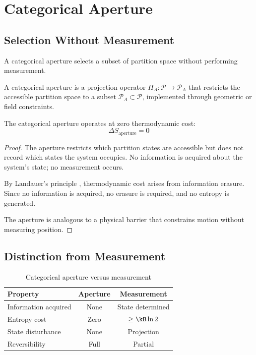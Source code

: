 \section{Categorical Aperture}
\label{sec:aperture}

\subsection{Selection Without Measurement}

A categorical aperture selects a subset of partition space without performing measurement.

\begin{definition}
\label{def:aperture}
A categorical aperture is a projection operator $\Pi_A: \mathcal{P} \to \mathcal{P}_A$ that restricts the accessible partition space to a subset $\mathcal{P}_A \subset \mathcal{P}$, implemented through geometric or field constraints.
\end{definition}

\begin{theorem}
\label{thm:zerocost}
The categorical aperture operates at zero thermodynamic cost:
\begin{equation}
    \Delta S_{\mathrm{aperture}} = 0
\end{equation}
\end{theorem}

\begin{proof}
The aperture restricts which partition states are accessible but does not record which states the system occupies. No information is acquired about the system's state; no measurement occurs.

By Landauer's principle \citep{landauer1961}, thermodynamic cost arises from information erasure. Since no information is acquired, no erasure is required, and no entropy is generated.

The aperture is analogous to a physical barrier that constrains motion without measuring position.
\end{proof}

\subsection{Distinction from Measurement}

\begin{table}[h]
\centering
\caption{Categorical aperture versus measurement}
\label{tab:aperture}
\begin{tabular}{lcc}
\toprule
\textbf{Property} & \textbf{Aperture} & \textbf{Measurement} \\
\midrule
Information acquired & None & State determined \\
Entropy cost & Zero & $\geq \kB \ln 2$ \\
State disturbance & None & Projection \\
Reversibility & Full & Partial \\
\bottomrule
\end{tabular}
\end{table}

